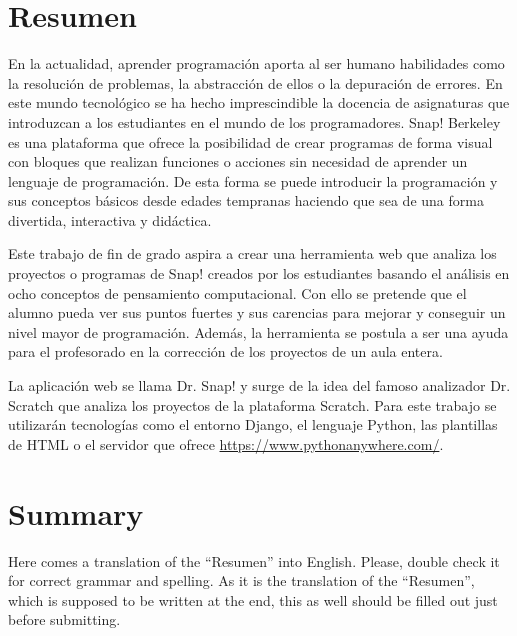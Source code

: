 \documentclass[a4paper, 12pt]{book}
\begin{document}

\chapter*{Resumen}

En la actualidad, aprender programación aporta al ser humano habilidades como la resolución de problemas, la abstracción de ellos o la depuración de errores. En este mundo tecnológico se ha hecho imprescindible la docencia de asignaturas que introduzcan a los estudiantes en el mundo de los programadores. Snap! Berkeley es una plataforma que ofrece la posibilidad de crear programas de forma visual con bloques que realizan funciones o acciones sin necesidad de aprender un lenguaje de programación. De esta forma se puede introducir la programación y sus conceptos básicos desde edades tempranas haciendo que sea de una forma divertida, interactiva y didáctica.

Este trabajo de fin de grado aspira a crear una herramienta web que analiza los proyectos o programas de Snap! creados por los estudiantes basando el análisis en ocho conceptos de pensamiento computacional. Con ello se pretende que el alumno pueda ver sus puntos fuertes y sus carencias para mejorar y conseguir un nivel mayor de programación. Además, la herramienta se postula a ser una ayuda para el profesorado en la corrección de los proyectos de un aula entera.

La aplicación web se llama Dr. Snap! y surge de la idea del famoso analizador Dr. Scratch que analiza los proyectos de la plataforma Scratch. Para este trabajo se utilizarán tecnologías como el entorno Django, el lenguaje Python, las plantillas de HTML o el servidor que ofrece \url{https://www.pythonanywhere.com/}.


\chapter*{Summary}

Here comes a translation of the ``Resumen'' into English. 
Please, double check it for correct grammar and spelling.
As it is the translation of the ``Resumen'', which is supposed to be written at the end, this as well should be filled out just before submitting.
\end{document}
